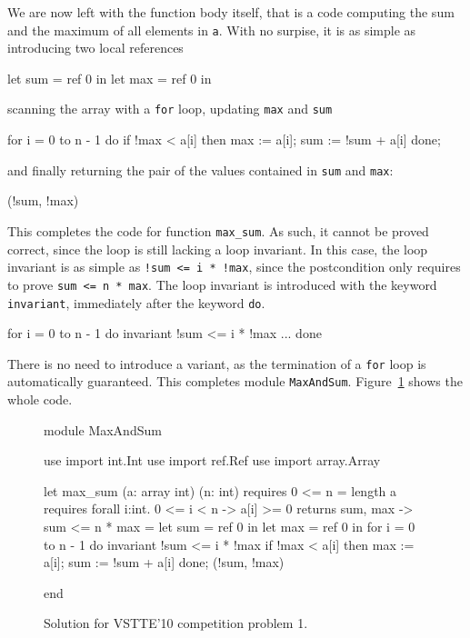 We are now left with the function body itself, that is a code
computing the sum and the maximum of all elements in \texttt{a}. With
no surpise, it is as simple as introducing two local references
\begin{whycode}
    let sum = ref 0 in
    let max = ref 0 in
\end{whycode}
scanning the array with a \texttt{for} loop, updating \texttt{max}
and \texttt{sum}
\begin{whycode}
    for i = 0 to n - 1 do
      if !max < a[i] then max := a[i];
      sum := !sum + a[i]
    done;
\end{whycode}
and finally returning the pair of the values contained in \texttt{sum}
and \texttt{max}:
\begin{whycode}
  (!sum, !max)
\end{whycode}
This completes the code for function \texttt{max\_sum}.
As such, it cannot be proved correct, since the loop is still lacking
a loop invariant. In this case, the loop invariant is as simple as
\verb|!sum <= i * !max|, since the postcondition only requires to prove
\verb|sum <= n * max|. The loop invariant is introduced with the
keyword \texttt{invariant}, immediately after the keyword \texttt{do}.
\begin{whycode}
    for i = 0 to n - 1 do
      invariant { !sum <= i * !max }
      ...
    done
\end{whycode}
There is no need to introduce a variant, as the termination of a
\texttt{for} loop is automatically guaranteed.
This completes module \texttt{MaxAndSum}.
Figure~\ref{fig:MaxAndSum} shows the whole code.
\begin{figure}
  \centering
\begin{whycode}
module MaxAndSum

  use import int.Int
  use import ref.Ref
  use import array.Array

  let max_sum (a: array int) (n: int)
    requires { 0 <= n = length a }
    requires { forall i:int. 0 <= i < n -> a[i] >= 0 }
    returns  { sum, max -> sum <= n * max }
  = let sum = ref 0 in
    let max = ref 0 in
    for i = 0 to n - 1 do
      invariant { !sum <= i * !max }
      if !max < a[i] then max := a[i];
      sum := !sum + a[i]
    done;
    (!sum, !max)

end
\end{whycode}
\vspace*{-1em}%
  \caption{Solution for VSTTE'10 competition problem 1.}
  \label{fig:MaxAndSum}
\end{figure}
